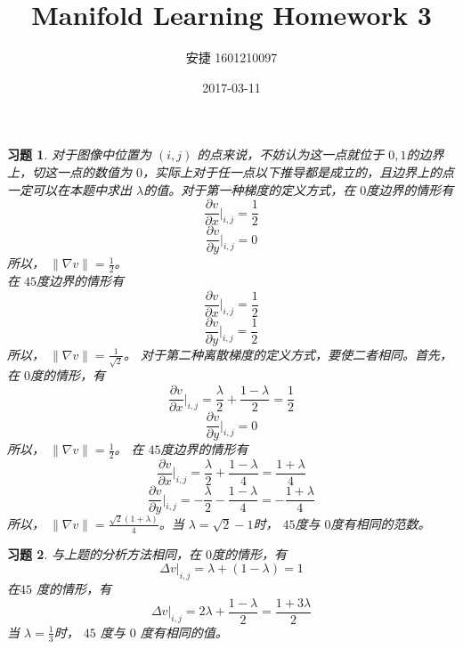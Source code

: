 \documentclass[a4paper, UTF8]{ctexart}
\title{Manifold Learning Homework 3}
\date{2017-03-11}
\author{安捷 1601210097}
\newtheorem*{exercise}{\textbf{习题}}
\begin{document}
\maketitle
  \begin{exercise}
    对于图像中位置为 $\left( i, j \right)$ 的点来说，不妨认为这一点就位于 $0,1$的边界上，切这一点的数值为 $0$，实际上对于任一点以下推导都是成立的，且边界上的点一定可以在本题中求出 $\lambda$的值。对于第一种梯度的定义方式，在 $0$度边界的情形有
    \begin{equation*}
      \frac{\partial v}{\partial x}\Big |_{i,j} = \frac{1}{2}
    \end{equation*}
    \begin{equation*}
      \frac{\partial v}{\partial y}\Big |_{i,j} = 0
    \end{equation*}
    所以， $\lVert \nabla v \rVert = \frac{1}{2}$。\\
    在 $45$度边界的情形有
    \begin{equation*}
      \frac{\partial v}{\partial x}\Big |_{i,j} = \frac{1}{2}
    \end{equation*}
    \begin{equation*}
      \frac{\partial v}{\partial y}\Big |_{i,j} = \frac{1}{2}
    \end{equation*}
    所以， $\lVert \nabla v \rVert = \frac{1}{\sqrt{2}}$。
    对于第二种离散梯度的定义方式，要使二者相同。首先，在 $0$度的情形，有
    \begin{equation*}
      \frac{\partial v}{\partial x}\Big |_{i,j} = \frac{\lambda}{2} + \frac{1-\lambda}{2} = \frac{1}{2}
    \end{equation*}
    \begin{equation*}
      \frac{\partial v}{\partial y}\Big |_{i,j} = 0
    \end{equation*}
    所以， $\lVert \nabla v \rVert = \frac{1}{2}$。
    在 $45$度边界的情形有
    \begin{equation*}
      \frac{\partial v}{\partial x}\Big |_{i,j} = \frac{\lambda}{2} + \frac{1-\lambda}{4} = \frac{1+\lambda}{4}
    \end{equation*}
    \begin{equation*}
      \frac{\partial v}{\partial y}\Big |_{i,j} = -\frac{\lambda}{2} - \frac{1-\lambda}{4} = -\frac{1+\lambda}{4}
    \end{equation*}
    所以， $\lVert \nabla v \rVert = \frac{\sqrt{2}\left(1+\lambda\right)}{4}$。当 $\lambda = \sqrt{2} - 1$时， $45$度与 $0$度有相同的范数。
  \end{exercise}
  \begin{exercise}
    与上题的分析方法相同，在 $0$度的情形，有
    \begin{equation*}
      \Delta v\big |_{i,j} = \lambda + \left( 1 - \lambda \right) = 1
    \end{equation*}
    在$45$ 度的情形，有
    \begin{equation*}
      \Delta v\big |_{i,j} = 2\lambda + \frac{1-\lambda}{2} = \frac{1 + 3 \lambda}{2}
    \end{equation*}
    当 $\lambda = \frac{1}{3}$时， $45$ 度与 $0$ 度有相同的值。
  \end{exercise}
\end{document}
